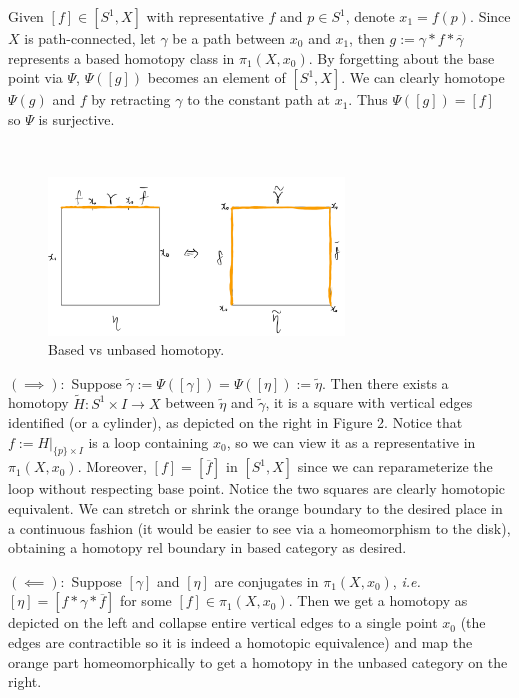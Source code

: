 \documentclass[12pt]{article}
\begin{document}
\begin{problem}[5]
	Given $ [f] \in [S^{1}, X]$ with representative $ f$ and $ p \in S^{1}$, denote $ x_1 = f(p)$. Since $ X$ is path-connected, let  $ \gamma$ be a path between $ x_0$ and $ x_1$, then $g:= \gamma * f * \overline{ \gamma}$ represents a based homotopy class in $ \pi_1( X,x_0)$. By forgetting about the base point via $ \Psi$, $ \Psi([g])$ becomes an element of $ [S^{1},X]$. We can clearly homotope $ \Psi(g)$ and  $ f$ by retracting  $ \gamma$ to the constant path at $ x_1$. Thus $ \Psi([g]) = [f]$ so $ \Psi$ is surjective.

~\begin{figure}[H]
	\centering
	\includegraphics[width=0.7\textwidth]{./figures/unbased.png}
	\caption{Based vs unbased homotopy.}
\end{figure}
$ (\implies):$ Suppose $ \widetilde{ \gamma}:=\Psi([ \gamma]) = \Psi([\eta]):= \widetilde{ \eta}$. Then there exists a homotopy $ \widetilde{ H}: S^{1} \times I \to X$ between $ \widetilde{ \eta}$ and $ \widetilde{ \gamma}$, it is a square with vertical edges identified (or a cylinder), as depicted on the right in Figure 2. Notice that $f:= H|_{ \{p\} \times I}$ is a loop containing $ x_0$, so we can view it as a representative in $ \pi_1( X,x_0)$. Moreover, $ [f] = [\overline{f}]$ in $ [S^{1},X]$ since we can reparameterize the loop without respecting base point. Notice the two squares are clearly homotopic equivalent. We can stretch or shrink the orange boundary to the desired place in a continuous fashion (it would be easier to see via a homeomorphism to the disk), obtaining a homotopy rel boundary in based category as desired.

	$ (\impliedby):$ Suppose $ [ \gamma]$ and $ [ \eta]$ are conjugates in $ \pi_1( X,x_0) $, \emph{i.e.} $ [ \eta] = [f * \gamma * \overline{f}]$ for some $ [f] \in \pi_1( X,x_0) $. Then we get a homotopy as depicted on the left and collapse entire vertical edges to a single point $ x_0$ (the edges are contractible so it is indeed a homotopic equivalence) and map the orange part homeomorphically to get a homotopy in the unbased category on the right.
\end{problem}
\end{document}
